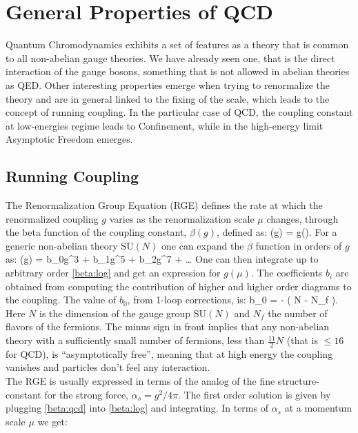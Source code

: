 \section{General Properties of QCD}
Quantum Chromodynamics exhibits a set of features as a theory that is common to all non-abelian gauge theories. We have already seen one, that is the direct interaction of the gauge bosons, something that is not allowed in abelian theories as QED. Other interesting properties emerge when trying to renormalize the theory and are in general linked to the fixing of the scale, which leads to the concept of running coupling. In the particular case of QCD, the coupling constant at low-energies regime leads to Confinement, while in the high-energy limit Asymptotic Freedom emerges. 

\subsection{Running Coupling} 
\label{sec:running_coupling}
The Renormalization Group Equation (RGE) defines the rate at which the renormalized coupling $g$ varies as the renormalization scale $\mu$ changes, through the beta function of the coupling constant, $\beta(g)$, defined as:
\beq
    \beta(g) = g(\mu).
    \label{beta:log}
\eeq 
For a generic non-abelian theory $\mathrm{SU}(N)$ one can expand the $\beta$ function in orders of $g$ as:
\beq
    \beta(g) = b_0g^3 + b_1g^5 + b_2g^7 + \dots   
\eeq
One can then integrate up to arbitrary order \cref{beta:log} and get an expression for $g(\mu)$. The coefficients $b_i$ are obtained from computing the contribution of higher and higher order diagrams to the coupling. The value of $b_0$, from 1-loop corrections, is:
\beq 
    b_0 = -  \left( N - N_f \right).
    \label{beta:qcd}
\eeq
Here $N$ is the dimension of the gauge group $\mathrm{SU}(N)$  and $N_f$ the number of flavors of the fermions. The minus sign in front implies that any non-abelian theory with a sufficiently small number of fermions, less than $\frac{11}{2}N$ (that is $\leq 16$ for QCD),  is ``asymptotically free'', meaning that at high energy the coupling vanishes and particles don't feel any interaction.\\
The RGE is usually expressed in terms of the analog of the fine structure-constant for the strong force, $\alpha_s = g^2/4\pi$. The first order solution is given by plugging \cref{beta:qcd} into \cref{beta:log} and integrating. In terms of $\alpha_s$ at a momentum scale $\mu$ we get: 
